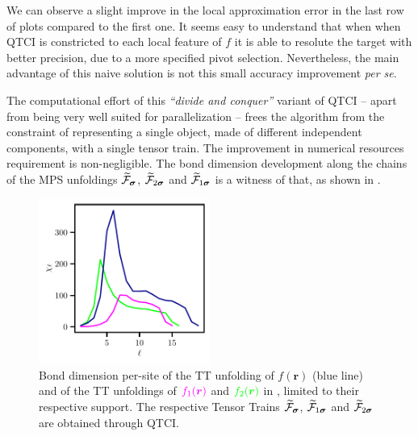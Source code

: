 


We can observe a slight improve in the local approximation error in the last row of plots compared to the first one. It seems easy to understand that when when QTCI is constricted to each local feature of $f$ it is able to resolute the target with better precision, due to a more specified pivot selection. Nevertheless, the main advantage of this naive solution is not this small accuracy improvement \textit{per se}. 

The computational effort of this \textit{``divide and conquer''} variant of QTCI -- apart from being very well suited for parallelization -- frees the algorithm from the constraint of representing a single object, made of different independent components, with a single tensor train. The improvement in numerical resources requirement is non-negligible. The bond dimension development along the chains of the MPS unfoldings $\widetilde{\mathcal{F}}_{\boldsymbol{\sigma}}$, $\widetilde{\mathcal{F}}_{2\boldsymbol{\sigma}}$ and $\widetilde{\mathcal{F}}_{1\boldsymbol{\sigma}}$ is a witness of that, as shown in . 

\begin{figure}[ht!]
	\centering
	\includegraphics[width=0.5\textwidth]{figures/bonddim_localised_func+bonddim_patches.pdf}
	\caption{Bond dimension per-site of the TT unfolding of $f(\boldsymbol{r})$ (blue line) and of the TT unfoldings of ${\color{mymagenta}f_1(\boldsymbol{r})}$ and ${\color{green} f_2(\boldsymbol{r})}$ in , limited to their respective support. The respective Tensor Trains  $\widetilde{\mathcal{F}}_{\boldsymbol{\sigma}}$, $\widetilde{\mathcal{F}}_{1\boldsymbol{\sigma}}$ and $\widetilde{\mathcal{F}}_{2\boldsymbol{\sigma}}$ are obtained through QTCI. }
	\label{fig:bondDimLocalFunc}
\end{figure}

